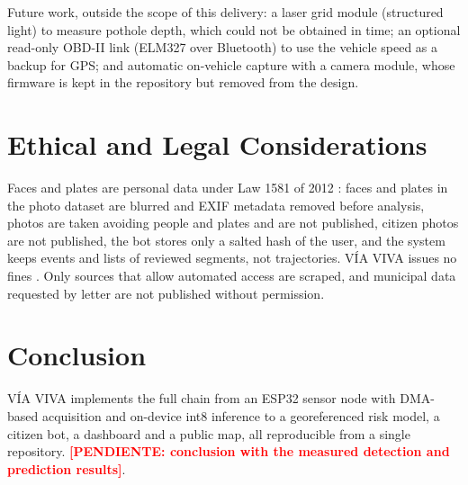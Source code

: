 \documentclass[journal,10pt]{IEEEtran}
\newcommand{\pendiente}[1]{\textcolor{red}{\textbf{[PENDIENTE: #1]}}}
\begin{document}
Future work, outside the scope of this delivery: a laser grid module (structured light) to measure pothole depth, which could not be obtained in time; an optional read-only OBD-II link (ELM327 over Bluetooth) to use the vehicle speed as a backup for GPS; and automatic on-vehicle capture with a camera module, whose firmware is kept in the repository but removed from the design.

\section{Ethical and Legal Considerations}
Faces and plates are personal data under Law 1581 of 2012 \cite{ley1581}: faces and plates in the photo dataset are blurred and EXIF metadata removed before analysis, photos are taken avoiding people and plates and are not published, citizen photos are not published, the bot stores only a salted hash of the user, and the system keeps events and lists of reviewed segments, not trajectories. V\'IA VIVA issues no fines \cite{ley1843}. Only sources that allow automated access are scraped, and municipal data requested by letter are not published without permission.

\section{Conclusion}
V\'IA VIVA implements the full chain from an ESP32 sensor node with DMA-based acquisition and on-device int8 inference to a georeferenced risk model, a citizen bot, a dashboard and a public map, all reproducible from a single repository. \pendiente{conclusion with the measured detection and prediction results}.


\end{document}
